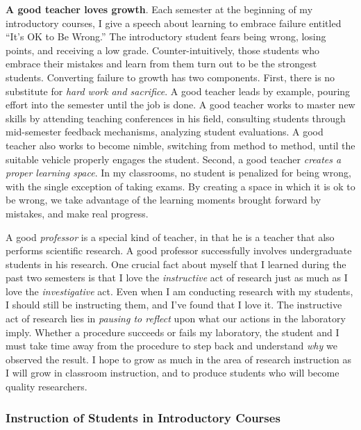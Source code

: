 \documentclass[../../main.tex]{subfiles}
\begin{document}
\textbf{A good teacher loves growth}.  Each semester at the beginning of my introductory courses, I give a speech about learning to embrace failure entitled ``It's OK to Be Wrong.''  The introductory student fears being wrong, losing points, and receiving a low grade.  Counter-intuitively, those students who embrace their mistakes and learn from them turn out to be the strongest students.  Converting failure to growth has two components.  First, there is no substitute for \textit{hard work and sacrifice}.  A good teacher leads by example, pouring effort into the semester until the job is done.  A good teacher works to master new skills by attending teaching conferences in his field, consulting students through mid-semester feedback mechanisms, analyzing student evaluations.  A good teacher also works to become nimble, switching from method to method, until the suitable vehicle properly engages the student.  Second, a good teacher \textit{creates a proper learning space}.  In my classrooms, no student is penalized for being wrong, with the single exception of taking exams.  By creating a space in which it is ok to be wrong, we take advantage of the learning moments brought forward by mistakes, and make real progress. \\ \hspace{0.1cm}

A good \textit{professor} is a special kind of teacher, in that he is a teacher that also performs scientific research.  A good professor successfully involves undergraduate students in his research.  One crucial fact about myself that I learned during the past two semesters is that I love the \textit{instructive} act of research just as much as I love the \textit{investigative} act.  Even when I am conducting research with my students, I should still be instructing them, and I've found that I love it.  The instructive act of research lies in \textit{pausing to reflect} upon what our actions in the laboratory imply.  Whether a procedure succeeds or fails my laboratory, the student and I must take time away from the procedure to step back and understand \textit{why} we observed the result.  I hope to grow as much in the area of research instruction as I will grow in classroom instruction, and to produce students who will become quality researchers.

\subsubsection{Instruction of Students in Introductory Courses}
\end{document}
